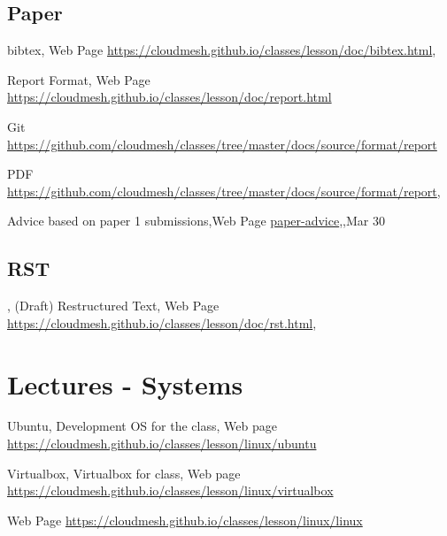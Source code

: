 \subsection{Paper}





bibtex, Web Page \url{https://cloudmesh.github.io/classes/lesson/doc/bibtex.html},

Report Format, Web Page \url{https://cloudmesh.github.io/classes/lesson/doc/report.html} 

Git \url{https://github.com/cloudmesh/classes/tree/master/docs/source/format/report}

PDF \url{https://github.com/cloudmesh/classes/tree/master/docs/source/format/report},

Advice based on paper 1 submissions,Web Page \url{paper-advice},,Mar 30



\subsection{RST}
, (Draft) Restructured Text, Web Page \url{https://cloudmesh.github.io/classes/lesson/doc/rst.html},


\section{Lectures - Systems}\label{lectures---systems}

Ubuntu, Development OS for the class, Web page \url{https://cloudmesh.github.io/classes/lesson/linux/ubuntu}

Virtualbox, Virtualbox for class, Web page \url{https://cloudmesh.github.io/classes/lesson/linux/virtualbox}





Web Page \url{https://cloudmesh.github.io/classes/lesson/linux/linux}

